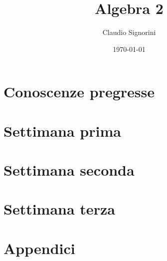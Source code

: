 \documentclass[a4paper,12pt]{book}
\title{Algebra 2}
\author{Claudio Signorini}
\date{\today}
\begin{document}
	
	
	
	\part{Conoscenze pregresse}
	
	
	
	
	
	
	
	\part{Settimana prima}
	
		
	
	
	
	\part{Settimana seconda}
	
	
	
	
	
	
	

	\part{Settimana terza}
	
	
	

	\part{Appendici}
	
	

	\printbibliography[heading=bibintoc,title={Bibliografia}]

	\listoffigures

	\tableofcontents
\end{document}
